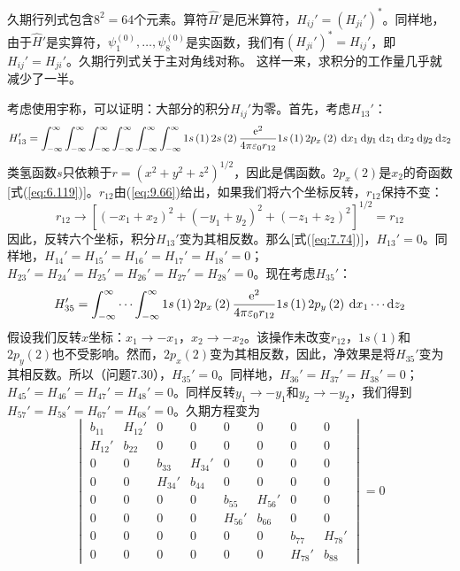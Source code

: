     久期行列式包含$8^2 = 64$个元素。算符$\hat{H}'$是厄米算符，$H_{ij}' = \left(H_{ji}'\right)^*$。同样地，由于$\hat{H}'$是实算符，$\psi_1^{\left(0\right)},\ldots, \psi_8^{\left(0\right)}$是实函数，我们有$\left(H_{ji}'\right)^* = H_{ij}'$，即$H_{ij}' = H_{ji}'$。久期行列式关于主对角线对称。 这样一来，求积分的工作量几乎就减少了一半。

    考虑使用宇称，可以证明：大部分的积分$H_{ij}'$为零。首先，考虑$H_{13}'$：
    \begin{equation*}
        H_{13}' = \int_{-\infty}^{\infty} \int_{-\infty}^{\infty} \int_{-\infty}^{\infty} \int_{-\infty}^{\infty} \int_{-\infty}^{\infty} \int_{-\infty}^{\infty} 1s\left(1\right)2s\left(2\right)\frac{\mathrm{e} ^2}{4\pi\varepsilon_0r_{12}}1s\left(1\right)2p_x\left(2\right)\:\dd x_1\:\dd y_1\:\dd z_1\:\dd x_2\:\dd y_2\:\dd z_2
    \end{equation*}
    类氢函数$s$只依赖于$r = \left(x^2+y^2+z^2\right)^{1/2}$，因此是偶函数。$2p_x\left(2\right)$是$x_2$的奇函数[式(\ref{eq:6.119})]。$r_{12}$由(\ref{eq:9.66})给出，如果我们将六个坐标反转，$r_{12}$保持不变：
    \begin{equation*}
        r_{12} \to \left[\left(-x_1+x_2\right)^2 + \left(-y_1+y_2\right)^2 + \left(-z_1+z_2\right)^2\right]^{1/2} = r_{12}
    \end{equation*}
    因此，反转六个坐标，积分$H_{13}'$变为其相反数。那么[式(\ref{eq:7.74})]，$H_{13}' = 0$。同样地，$H_{14}' = H_{15}' = H_{16}' = H_{17}' = H_{18}' = 0$；$H_{23}' = H_{24}' = H_{25}' = H_{26}' = H_{27}' = H_{28}' = 0$。现在考虑$H_{35}'$：
    \begin{equation*}
        H_{35}' = \int_{-\infty}^{\infty} \cdots \int_{-\infty}^{\infty} 1s\left(1\right)2p_x\left(2\right)\frac{\mathrm{e} ^2}{4\pi\varepsilon_0r_{12}}1s\left(1\right)2p_y\left(2\right)\:\dd x_1\cdots\dd z_2
    \end{equation*}
    假设我们反转$x$坐标：$x_1 \to -x_1$，$x_2 \to -x_2$。该操作未改变$r_{12}$，$1s\left(1\right)$和$2p_y\left(2\right)$也不受影响。然而，$2p_x\left(2\right)$变为其相反数，因此，净效果是将$H_{35}'$变为其相反数。所以（问题7.30），$H_{35}' = 0$。同样地，$H_{36}' = H_{37}' = H_{38}' = 0$；$H_{45}' = H_{46}' = H_{47}' = H_{48}' = 0$。同样反转$y_1 \to -y_1$和$y_2 \to -y_2$，我们得到$H_{57}' = H_{58}' = H_{67}' = H_{68}' = 0$。久期方程变为
    \begin{equation*}
        \begin{vmatrix}
            b_{11} & H_{12}' & 0 & 0 & 0 & 0 & 0 & 0 \\
            H_{12}' & b_{22} & 0 & 0 & 0 & 0 & 0 & 0 \\
            0 & 0 & b_{33} & H_{34}' & 0 & 0 & 0 & 0 \\
            0 & 0 & H_{34}' & b_{44} & 0 & 0 & 0 & 0 \\
            0 & 0 & 0 & 0 & b_{55} & H_{56}' & 0 & 0 \\
            0 & 0 & 0 & 0 & H_{56}' & b_{66} & 0 & 0 \\
            0 & 0 & 0 & 0 & 0 & 0 & b_{77} & H_{78}' \\
            0 & 0 & 0 & 0 & 0 & 0 & H_{78}' & b_{88}
        \end{vmatrix} = 0
    \end{equation*}
